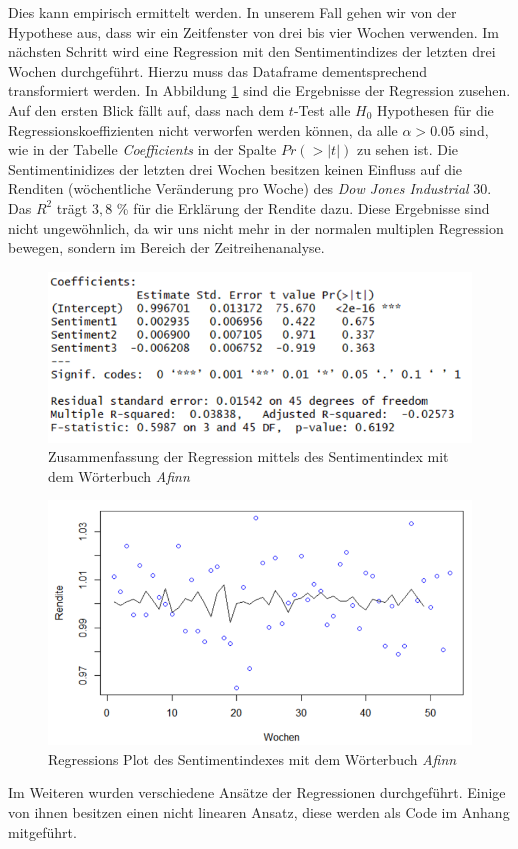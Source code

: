 Dies kann empirisch ermittelt werden. In unserem Fall gehen wir von der Hypothese aus, dass wir ein Zeitfenster von drei bis vier Wochen verwenden. Im nächsten Schritt wird eine Regression mit den Sentimentindizes der letzten drei Wochen durchgeführt. Hierzu muss das Dataframe dementsprechend transformiert werden. In Abbildung \ref{Afinn_summary} sind die Ergebnisse der Regression zusehen. Auf den ersten Blick fällt auf, dass nach dem $t$-Test alle $H_{0}$ Hypothesen für die Regressionskoeffizienten nicht verworfen werden können, da alle $\alpha>0.05$ sind, wie in der Tabelle \textit{Coefficients} in der Spalte $Pr(>|t|)$ zu sehen ist. Die Sentimentinidizes der letzten drei Wochen besitzen keinen Einfluss auf die Renditen (wöchentliche Veränderung pro Woche)  des \textit{Dow Jones Industrial} $30$. Das $R^2$ trägt $3,8$ \% für die Erklärung der Rendite dazu. Diese Ergebnisse sind nicht ungewöhnlich, da wir uns nicht mehr in der normalen multiplen Regression bewegen, sondern im Bereich der Zeitreihenanalyse.
 \begin{figure}[H]
	\centering
	\includegraphics[width=1\textwidth]{Pictures/afinn_summary.png}
	\caption{Zusammenfassung der Regression mittels des Sentimentindex mit dem Wörterbuch \textit{Afinn} }
	\label{Afinn_summary}
\end{figure} 
\begin{figure}[H]
	\centering
	\includegraphics[width=1\textwidth]{Pictures/Afinn_plot.png}
	\caption{Regressions Plot des Sentimentindexes mit dem Wörterbuch \textit{Afinn} }
	\label{Afinn_plot_regression}
\end{figure} 
Im Weiteren wurden verschiedene Ansätze der Regressionen durchgeführt. Einige von ihnen besitzen einen nicht linearen Ansatz, diese werden als Code im Anhang mitgeführt.  

